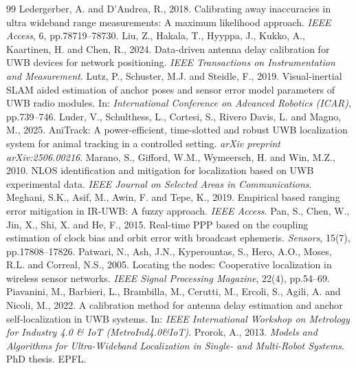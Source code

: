 \documentclass[11pt,a4paper]{article}
\begin{document}
\begin{thebibliography}{99}
 Ledergerber, A. and D'Andrea, R., 2018. Calibrating away inaccuracies in ultra wideband range measurements: A maximum likelihood approach. \emph{IEEE Access}, 6, pp.78719--78730.
 Liu, Z., Hakala, T., Hyyppa, J., Kukko, A., Kaartinen, H. and Chen, R., 2024. Data-driven antenna delay calibration for UWB devices for network positioning. \emph{IEEE Transactions on Instrumentation and Measurement}.
 Lutz, P., Schuster, M.J. and Steidle, F., 2019. Visual-inertial SLAM aided estimation of anchor poses and sensor error model parameters of UWB radio modules. In: \emph{International Conference on Advanced Robotics (ICAR)}, pp.739--746.
 Luder, V., Schulthess, L., Cortesi, S., Rivero Davis, L. and Magno, M., 2025. AniTrack: A power-efficient, time-slotted and robust UWB localization system for animal tracking in a controlled setting. \emph{arXiv preprint arXiv:2506.00216}.
 Marano, S., Gifford, W.M., Wymeersch, H. and Win, M.Z., 2010. NLOS identification and mitigation for localization based on UWB experimental data. \emph{IEEE Journal on Selected Areas in Communications}.
 Meghani, S.K., Asif, M., Awin, F. and Tepe, K., 2019. Empirical based ranging error mitigation in IR-UWB: A fuzzy approach. \emph{IEEE Access}.
 Pan, S., Chen, W., Jin, X., Shi, X. and He, F., 2015. Real-time PPP based on the coupling estimation of clock bias and orbit error with broadcast ephemeris. \emph{Sensors}, 15(7), pp.17808--17826.
 Patwari, N., Ash, J.N., Kyperountas, S., Hero, A.O., Moses, R.L. and Correal, N.S., 2005. Locating the nodes: Cooperative localization in wireless sensor networks. \emph{IEEE Signal Processing Magazine}, 22(4), pp.54--69.
 Piavanini, M., Barbieri, L., Brambilla, M., Cerutti, M., Ercoli, S., Agili, A. and Nicoli, M., 2022. A calibration method for antenna delay estimation and anchor self-localization in UWB systems. In: \emph{IEEE International Workshop on Metrology for Industry 4.0 \& IoT (MetroInd4.0\&IoT)}.
 Prorok, A., 2013. \emph{Models and Algorithms for Ultra-Wideband Localization in Single- and Multi-Robot Systems}. PhD thesis. EPFL.

\end{thebibliography}
\end{document}
